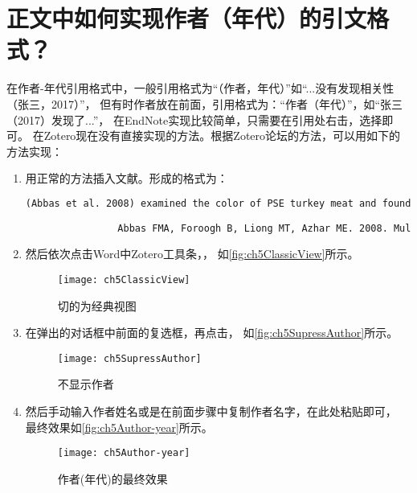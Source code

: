 \documentclass[cn,11pt,chinese]{elegantbook}
\begin{document}
		\section{正文中如何实现作者（年代）的引文格式？}\label{sec:author_year}
			在作者-年代引用格式中，一般引用格式为“（作者，年代）”如“...没有发现相关性（张三，2017）”，
			但有时作者放在前面，引用格式为：“作者（年代）”，如“张三（2017）发现了...”，
			在EndNote实现比较简单，只需要在引用处右击，选择即可。
			在Zotero现在没有直接实现的方法。根据Zotero论坛的方法，可以用如下的方法实现：
			\begin{enumerate}
			\item 用正常的方法插入文献。形成的格式为：\label{it:copyAuthor}
				\begin{lstlisting}[language=HTML]
				(Abbas et al. 2008) examined the color of PSE turkey meat and found that the L* value was significantly negative correlated.

				Abbas FMA, Foroogh B, Liong MT, Azhar ME. 2008. Multivariate statistical analysis of antioxidants in dates (phoenix dactylifera). Int. Food Res. J. 15(2):193–200
				\end{lstlisting}
			\item 然后依次点击Word中Zotero工具条，，
			如\autoref{fig:ch5ClassicView}所示。
				\begin{figure}[htbp]
					\centering
					\texttt{[image: ch5ClassicView]}
					\caption{切的为经典视图}
					\label{fig:ch5ClassicView}
				\end{figure}
			\item 在弹出的对话框中前面的复选框，再点击，
			如\autoref{fig:ch5SupressAuthor}所示。
				\begin{figure}[htbp]
					\centering
					\texttt{[image: ch5SupressAuthor]}
					\caption{不显示作者}
					\label{fig:ch5SupressAuthor}
				\end{figure}
			\item 然后手动输入作者姓名或是在前面步骤中复制作者名字，在此处粘贴即可，
			最终效果如\autoref{fig:ch5Author-year}所示。
				\begin{figure}[htbp]
					\centering
					\texttt{[image: ch5Author-year]}
					\caption{作者(年代)的最终效果}
					\label{fig:ch5Author-year}
				\end{figure}
			\end{enumerate}
\end{document}
